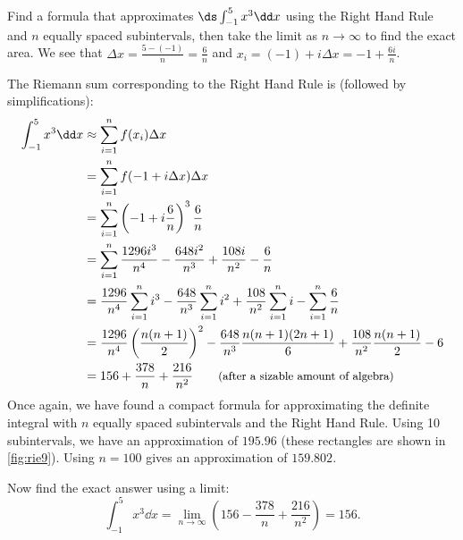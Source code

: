 \begin{example}\label{ex_rie10}%
Find a formula that approximates $\ds\int_{-1}^5 x^3\dd x$ using the Right Hand Rule and $n$ equally spaced subintervals, then take the limit as $n\to\infty$ to find the exact area.
\solution
We see that %
$\Delta x = \frac{5-(-1)}{n} = \frac6n$ and $x_i = (-1) + i\Delta x=-1+\frac{6i}n$.

The Riemann sum corresponding to the Right Hand Rule is (followed by simplifications):
\begin{align*}
	\int_{-1}^5 x^3\dd x %
	&\approx \sum_{i=1}^n f(x_i)\Delta x \\
	&= \sum_{i=1}^n f(-1+i\Delta x)\Delta x \\
	&= \sum_{i=1}^n \left(-1+i\frac6n\right)^3\frac6n \\
	&= \sum_{i=1}^n \frac{1296 i^3}{n^4}-\frac{648 i^2}{n^3}+\frac{108 i}{n^2}-\frac6n \\
	&= \frac{1296}{n^4}\sum_{i=1}^n i^3 -\frac{648}{n^3}\sum_{i=1}^n i^2+\frac{108}{n^2}\sum_{i=1}^n i-\sum_{i=1}^n\frac6n \\
	&= \frac{1296}{n^4}\left(\frac{n(n+1)}{2}\right)^2 -\frac{648}{n^3}\frac{n(n+1)(2n+1)}{6}+\frac{108}{n^2}\frac{n(n+1)}{2}-6 \\
	&=156 + \frac{378}n + \frac{216}{n^2} \qquad\text{\small (after a sizable amount of algebra)}
\end{align*}
Once again, we have found a compact formula for approximating the definite integral with $n$ equally spaced subintervals and the Right Hand Rule. Using 10 subintervals, we have an approximation of $195.96$ (these rectangles are shown in \autoref{fig:rie9}). Using $n=100$ gives an approximation of $159.802$. 


Now find the exact answer using a limit:
\[
\int_{-1}^5 x^3\dd x
= \lim_{n\to\infty} \left(156 - \frac{378}n + \frac{216}{n^2}\right) = 156.
\]
\end{example}

